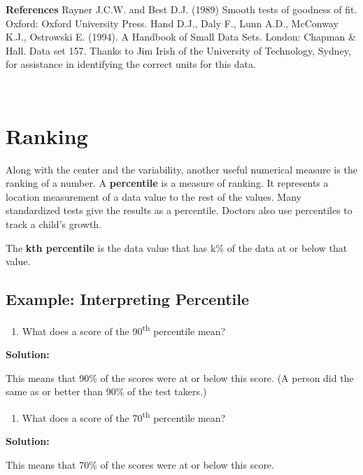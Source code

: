 \documentclass[
]{book}
\providecommand{\tightlist}{%
  \setlength{\itemsep}{0pt}\setlength{\parskip}{0pt}}
\begin{document}
\textbf{References}
Rayner J.C.W. and Best D.J. (1989) Smooth tests of goodness of fit. Oxford: Oxford University Press.
Hand D.J., Daly F., Lunn A.D., McConway K.J., Ostrowski E. (1994). A Handbook of Small Data Sets. London: Chapman \& Hall. Data set 157.
Thanks to Jim Irish of the University of Technology, Sydney, for assistance in identifying the correct units for this data.

\textbf{\\
}

\hypertarget{ranking}{%
\section{Ranking}\label{ranking}}

Along with the center and the variability, another useful numerical measure is the ranking of a number. A \textbf{percentile} is a measure of ranking. It represents a location measurement of a data value to the
rest of the values. Many standardized tests give the results as a percentile. Doctors also use percentiles to track a child's growth.

The \textbf{kth percentile} is the data value that has k\% of the data at or below that value.

\hypertarget{example-interpreting-percentile}{%
\subsection{Example: Interpreting Percentile}\label{example-interpreting-percentile}}

\begin{enumerate}
\def\labelenumi{\alph{enumi}.}
\tightlist
\item
  What does a score of the 90\textsuperscript{th} percentile mean?
\end{enumerate}

\textbf{Solution:}

This means that 90\% of the scores were at or below this score. (A person did the same as or better than 90\% of the test takers.)

\begin{enumerate}
\def\labelenumi{\alph{enumi}.}
\setcounter{enumi}{1}
\tightlist
\item
  What does a score of the 70\textsuperscript{th} percentile mean?
\end{enumerate}

\textbf{Solution:}

This means that 70\% of the scores were at or below this score.
\end{document}

